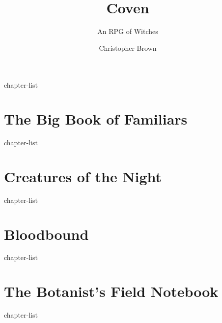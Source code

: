 \documentclass[a4paper,10pt,twocolumn]{memoir}
\title{Coven}
\subtitle{An RPG of Witches}
\author{Christopher Brown}
\begin{document}
\frontmatter

\titlepage



\tableofcontents

\mainmatter

{chapter-list}

\part{The Big Book of Familiars}
{chapter-list}

\part{Creatures of the Night}
{chapter-list}

\part{Bloodbound}
{chapter-list}

\part{The Botanist's Field Notebook}
{chapter-list}

\backmatter

\printindex
\end{document}
